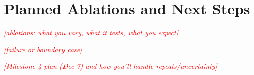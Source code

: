 \documentclass[conference,10pt,letterpaper]{IEEEtran}
\newcommand{\pw}[1]{\textcolor{red}{\textit{[#1]}}}
\begin{document}
\section{Planned Ablations and Next Steps}

\pw{ablations: what you vary, what it tests, what you expect}

\pw{failure or boundary case}

\pw{Milestone 4 plan (Dec 7) and how you'll handle repeats/uncertainty}

% 
% 
\end{document}
